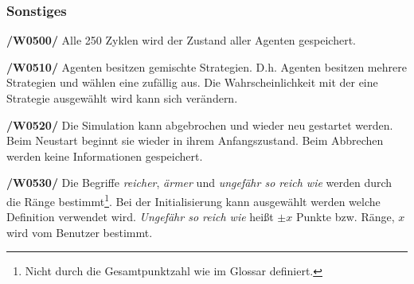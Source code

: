 \subsubsection{Sonstiges}

\textbf{/W0500/}
Alle 250 Zyklen wird der Zustand aller Agenten gespeichert.

\textbf{/W0510/}
Agenten besitzen gemischte Strategien. D.h. Agenten besitzen mehrere Strategien und wählen eine zufällig aus. Die Wahrscheinlichkeit mit der eine Strategie ausgewählt wird kann sich verändern.

\textbf{/W0520/}
Die Simulation kann abgebrochen und wieder neu gestartet werden. Beim Neustart beginnt sie wieder in ihrem Anfangszustand. Beim Abbrechen werden keine Informationen gespeichert.

\textbf{/W0530/}
Die Begriffe \emph{reicher}, \emph{ärmer} und \emph{ungefähr so reich wie} werden durch die Ränge bestimmt\footnote{Nicht durch die Gesamtpunktzahl wie im Glossar definiert.}. Bei der Initialisierung kann ausgewählt werden welche Definition verwendet wird. \emph{Ungefähr so reich wie} heißt $\pm x$ Punkte bzw. Ränge, $x$ wird vom Benutzer bestimmt.